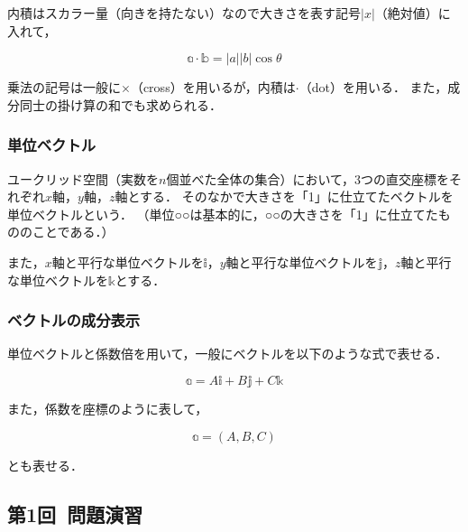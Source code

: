 \documentclass[a4paper,11pt]{ltjsarticle}
\begin{document}
内積はスカラー量（向きを持たない）なので大きさを表す記号$|x|$（絶対値）に入れて，

\begin{equation*}
  \mathbb{a} \cdot \mathbb{b} = |a||b|\cos \theta
\end{equation*}

乗法の記号は一般に$\times$（cross）を用いるが，内積は$\cdot$（dot）を用いる．
また，成分同士の掛け算の和でも求められる．

\clearpage

\subsubsection{単位ベクトル}


ユークリッド空間（実数を$n$個並べた全体の集合）において，3つの直交座標をそれぞれ$x$軸，$y$軸，$z$軸とする．
そのなかで大きさを「1」に仕立てたベクトルを単位ベクトルという．
（単位○○は基本的に，○○の大きさを「1」に仕立てたもののことである．）

また，$x$軸と平行な単位ベクトルを$\mathbb{i}$，$y$軸と平行な単位ベクトルを$\mathbb{j}$，$z$軸と平行な単位ベクトルを$\mathbb{k}$とする．

\subsubsection{ベクトルの成分表示}


単位ベクトルと係数倍を用いて，一般にベクトルを以下のような式で表せる．

\begin{equation*}
  \mathbb{a}=A \mathbb{i}+B \mathbb{j}+C \mathbb{k}
\end{equation*}

また，係数を座標のように表して，

\begin{equation*}
  \mathbb{a}=(A,B,C)
\end{equation*}

とも表せる．

\subsection{第1回\ 問題演習}

\begin{center}
\end{center}
\end{document}

